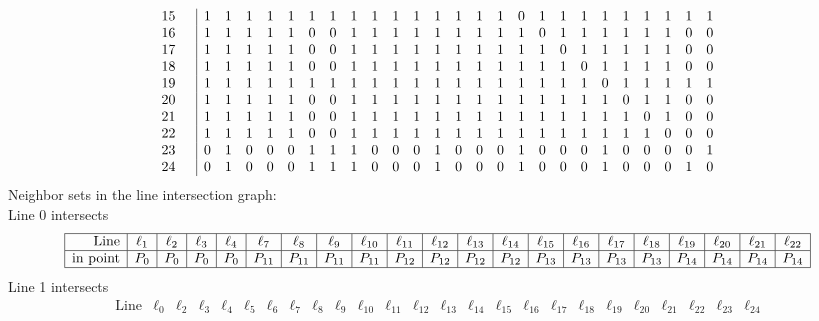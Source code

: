 \documentclass{article}
\begin{document}
{{$$\begin{array}{rr|*{25}r}
15 &  & 1 & 1 & 1 & 1 & 1 & 1 & 1 & 1 & 1 & 1 & 1 & 1 & 1 & 1 & 1 & 0 & 1 & 1 & 1 & 1 & 1 & 1 & 1 & 1 & 1\\
16 &  & 1 & 1 & 1 & 1 & 1 & 0 & 0 & 1 & 1 & 1 & 1 & 1 & 1 & 1 & 1 & 1 & 0 & 1 & 1 & 1 & 1 & 1 & 1 & 0 & 0\\
17 &  & 1 & 1 & 1 & 1 & 1 & 0 & 0 & 1 & 1 & 1 & 1 & 1 & 1 & 1 & 1 & 1 & 1 & 0 & 1 & 1 & 1 & 1 & 1 & 0 & 0\\
18 &  & 1 & 1 & 1 & 1 & 1 & 0 & 0 & 1 & 1 & 1 & 1 & 1 & 1 & 1 & 1 & 1 & 1 & 1 & 0 & 1 & 1 & 1 & 1 & 0 & 0\\
19 &  & 1 & 1 & 1 & 1 & 1 & 1 & 1 & 1 & 1 & 1 & 1 & 1 & 1 & 1 & 1 & 1 & 1 & 1 & 1 & 0 & 1 & 1 & 1 & 1 & 1\\
20 &  & 1 & 1 & 1 & 1 & 1 & 0 & 0 & 1 & 1 & 1 & 1 & 1 & 1 & 1 & 1 & 1 & 1 & 1 & 1 & 1 & 0 & 1 & 1 & 0 & 0\\
21 &  & 1 & 1 & 1 & 1 & 1 & 0 & 0 & 1 & 1 & 1 & 1 & 1 & 1 & 1 & 1 & 1 & 1 & 1 & 1 & 1 & 1 & 0 & 1 & 0 & 0\\
22 &  & 1 & 1 & 1 & 1 & 1 & 0 & 0 & 1 & 1 & 1 & 1 & 1 & 1 & 1 & 1 & 1 & 1 & 1 & 1 & 1 & 1 & 1 & 0 & 0 & 0\\
23 &  & 0 & 1 & 0 & 0 & 0 & 1 & 1 & 1 & 0 & 0 & 0 & 1 & 0 & 0 & 0 & 1 & 0 & 0 & 0 & 1 & 0 & 0 & 0 & 0 & 1\\
24 &  & 0 & 1 & 0 & 0 & 0 & 1 & 1 & 1 & 0 & 0 & 0 & 1 & 0 & 0 & 0 & 1 & 0 & 0 & 0 & 1 & 0 & 0 & 0 & 1 & 0\\
\end{array}
$$
}%
Neighbor sets in the line intersection graph:\\
Line 0 intersects 
$$
\begin{array}{|r*{20}{|c}|}
\hline
\mbox{Line}  & \ell_{1} & \ell_{2} & \ell_{3} & \ell_{4} & \ell_{7} & \ell_{8} & \ell_{9} & \ell_{10} & \ell_{11} & \ell_{12} & \ell_{13} & \ell_{14} & \ell_{15} & \ell_{16} & \ell_{17} & \ell_{18} & \ell_{19} & \ell_{20} & \ell_{21} & \ell_{22}\\
\hline
\mbox{in point}  & P_{0} & P_{0} & P_{0} & P_{0} & P_{11} & P_{11} & P_{11} & P_{11} & P_{12} & P_{12} & P_{12} & P_{12} & P_{13} & P_{13} & P_{13} & P_{13} & P_{14} & P_{14} & P_{14} & P_{14}\\
\hline
\end{array}
$$
Line 1 intersects 
$$
\begin{array}{|r*{24}{|c}|}
\hline
\mbox{Line}  & \ell_{0} & \ell_{2} & \ell_{3} & \ell_{4} & \ell_{5} & \ell_{6} & \ell_{7} & \ell_{8} & \ell_{9} & \ell_{10} & \ell_{11} & \ell_{12} & \ell_{13} & \ell_{14} & \ell_{15} & \ell_{16} & \ell_{17} & \ell_{18} & \ell_{19} & \ell_{20} & \ell_{21} & \ell_{22} & \ell_{23} & \ell_{24}\\

\end{array}$$}
\end{document}
